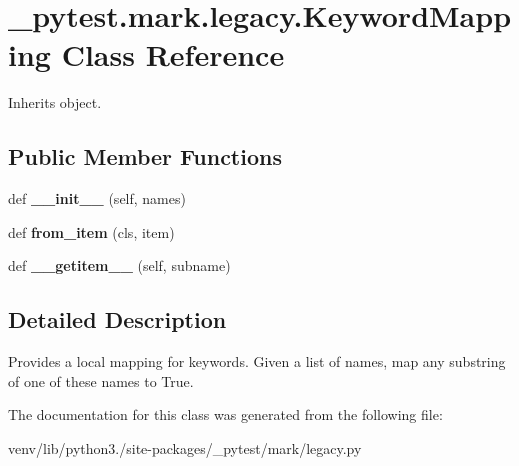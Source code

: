 \hypertarget{class__pytest_1_1mark_1_1legacy_1_1_keyword_mapping}{}\section{\+\_\+pytest.\+mark.\+legacy.\+Keyword\+Mapping Class Reference}
\label{class__pytest_1_1mark_1_1legacy_1_1_keyword_mapping}


Inherits object.

\subsection*{Public Member Functions}
\begin{DoxyCompactItemize}
\item 
\mbox{\label{class__pytest_1_1mark_1_1legacy_1_1_keyword_mapping_ac4212eba65217edc128bcb8aa7f326b9}} 
def {\bfseries \+\_\+\+\_\+init\+\_\+\+\_\+} (self, names)
\item 
\mbox{\label{class__pytest_1_1mark_1_1legacy_1_1_keyword_mapping_a7e588766f4703db47742536e96280532}} 
def {\bfseries from\+\_\+item} (cls, item)
\item 
\mbox{\label{class__pytest_1_1mark_1_1legacy_1_1_keyword_mapping_a45611d153d857980bc71f1723054ee49}} 
def {\bfseries \+\_\+\+\_\+getitem\+\_\+\+\_\+} (self, subname)
\end{DoxyCompactItemize}


\subsection{Detailed Description}
\begin{DoxyVerb}Provides a local mapping for keywords.
Given a list of names, map any substring of one of these names to True.
\end{DoxyVerb}
 

The documentation for this class was generated from the following file\+:\begin{DoxyCompactItemize}
\item 
venv/lib/python3./site-\/packages/\+\_\+pytest/mark/legacy.\+py\end{DoxyCompactItemize}
